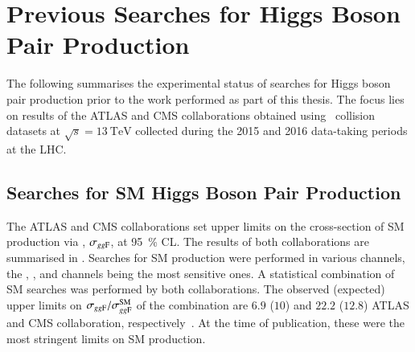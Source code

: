 \section{Previous Searches for Higgs Boson Pair Production}%
\label{seq:experimental_status}

The following summarises the experimental status of searches for Higgs boson
pair production prior to the work performed as part of this thesis. The focus
lies on results of the ATLAS and CMS collaborations obtained using \pp~collision
datasets at $\sqrt{s} = \SI{13}{\TeV}$ collected during the 2015 and 2016
data-taking periods at the LHC.


\subsection*{Searches for SM Higgs Boson Pair Production}%
\label{sec:past_results_smhh}


The ATLAS and CMS collaborations set upper limits on the cross-section of SM \HH
production via \ggF, $\sigma_{gg\text{F}}$, at \SI{95}{\percent} CL. The results of
both collaborations are summarised in . Searches for
SM \HH production were performed in various channels, the \bbbb, \bbtautau, and
\bbyy channels being the most sensitive ones. A statistical combination of SM
\HH searches was performed by both collaborations. The observed (expected) upper
limits on $\sigma_{gg\text{F}} / \sigma_{gg\text{F}}^{\text{SM}}$ of the combination are
$6.9$ ($10$) and $22.2$ ($12.8$) ATLAS and CMS collaboration,
respectively~\cite{HDBS-2018-58,CMS-HIG-17-030}. At the time of publication,
these were the most stringent limits on SM \HH production.

